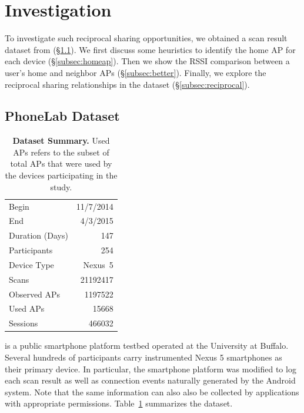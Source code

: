 \newpage
\clearpage

\section{Investigation}
\label{sec:investigation}

To investigate such reciprocal sharing opportunities, we obtained a \wifi{} scan
result dataset from \PhoneLab{} (\S\ref{subsec:phonelab}). We first discuss some
heuristics to identify the home AP for each device (\S\ref{subsec:homeap}). Then
we show the RSSI comparison between a user's home and neighbor APs
(\S\ref{subsec:better}). Finally, we explore the reciprocal sharing
relationships in the dataset (\S\ref{subsec:reciprocal}).

\subsection{PhoneLab \wifi{} Dataset}
\label{subsec:phonelab}

\begin{table}[t]
  \begin{tabularx}{\columnwidth}{Xr}
    \toprule
    Begin & 11/7/2014 \\ 
    End & 4/3/2015 \\ 
    Duration (Days) & 147 \\ \midrule
    Participants & 254 \\
    Device Type & Nexus~5 \\ \midrule
    Scans & \num{21192417} \\
    Observed APs & \num{1197522} \\
    Used APs & \num{15668} \\ \midrule
    \wifi{} Sessions & \num{466032} \\
    \bottomrule
  \end{tabularx}
  \caption{\textbf{\PhoneLab{} \wifi{} Dataset Summary.} Used APs refers to the
  subset of total APs that were used by the devices participating in the study.}
  \label{tab:summary}
\end{table}

\PhoneLab{}\cite{phonelab-sensemine13} is a public smartphone platform testbed
operated at the University at Buffalo. Several hundreds of participants carry
instrumented Nexus 5 smartphones as their primary device. In particular, the
smartphone platform was modified to log each \wifi{} scan result as well as
connection events naturally generated by the Android system. Note that the same
information can also also be collected by applications with appropriate permissions.
Table~\ref{tab:summary} summarizes the \PhoneLab{} \wifi{} dataset.

